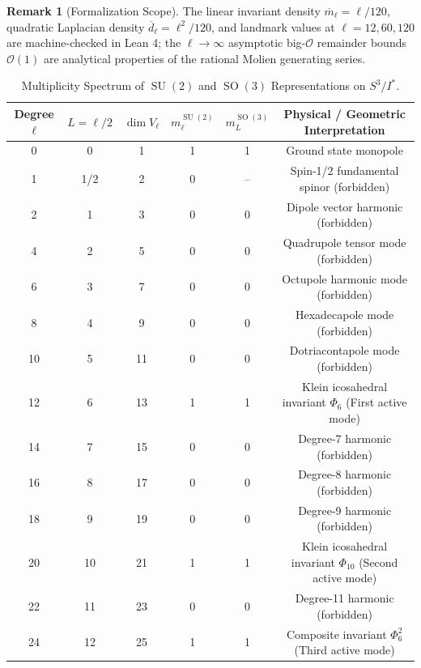 \documentclass[11pt,a4paper]{article}
\theoremstyle{definition}
\newtheorem{remark}[theorem]{Remark}
\DeclareMathOperator{\SU}{SU}
\DeclareMathOperator{\SO}{SO}
\begin{document}
\begin{remark}[Formalization Scope]
The linear invariant density $\overline{m}_\ell = \ell/120$, quadratic Laplacian density $\overline{d}_\ell = \ell^2/120$, and landmark values at $\ell = 12, 60, 120$ are machine-checked in Lean 4; the $\ell \to \infty$ asymptotic big-$\mathcal{O}$ remainder bounds $\mathcal{O}(1)$ are analytical properties of the rational Molien generating series.
\end{remark}

\begin{table}[htbp]
\centering
\small
\caption{Multiplicity Spectrum of $\SU(2)$ and $\SO(3)$ Representations on $S^3 / I^*$.}
\label{tab:multiplicities}
\vspace{0.5em}
\begin{tabular}{cccccc}
\toprule
\textbf{Degree $\ell$} & \textbf{$L = \ell/2$} & \textbf{$\dim V_\ell$} & \textbf{$m_\ell^{\SU(2)}$} & \textbf{$m_L^{\SO(3)}$} & \textbf{Physical / Geometric Interpretation} \\
\midrule
0  & 0   & 1  & 1 & 1   & Ground state monopole \\
1  & 1/2 & 2  & 0 & --  & Spin-1/2 fundamental spinor (forbidden) \\
2  & 1   & 3  & 0 & 0   & Dipole vector harmonic (forbidden) \\
4  & 2   & 5  & 0 & 0   & Quadrupole tensor mode (forbidden) \\
6  & 3   & 7  & 0 & 0   & Octupole harmonic mode (forbidden) \\
8  & 4   & 9  & 0 & 0   & Hexadecapole mode (forbidden) \\
10 & 5   & 11 & 0 & 0   & Dotriacontapole mode (forbidden) \\
12 & 6   & 13 & 1 & 1   & Klein icosahedral invariant $\Phi_6$ (First active mode) \\
14 & 7   & 15 & 0 & 0   & Degree-7 harmonic (forbidden) \\
16 & 8   & 17 & 0 & 0   & Degree-8 harmonic (forbidden) \\
18 & 9   & 19 & 0 & 0   & Degree-9 harmonic (forbidden) \\
20 & 10  & 21 & 1 & 1   & Klein icosahedral invariant $\Phi_{10}$ (Second active mode) \\
22 & 11  & 23 & 0 & 0   & Degree-11 harmonic (forbidden) \\
24 & 12  & 25 & 1 & 1   & Composite invariant $\Phi_6^2$ (Third active mode) \\
\bottomrule
\end{tabular}
\end{table}
\end{document}
